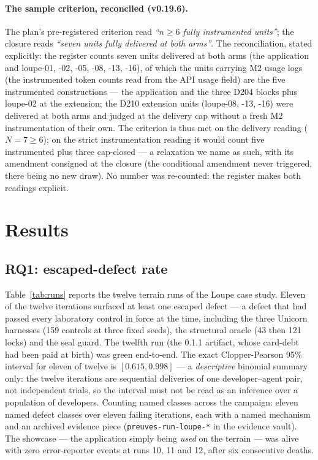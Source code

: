 \documentclass[10pt,a4paper]{article}
\newcommand{\code}[1]{\texttt{\small #1}}
\begin{document}
\paragraph{The sample criterion, reconciled (v0.19.6).} The plan's
pre-registered criterion read \emph{``$n\ge6$ fully instrumented
units''}; the closure reads \emph{``seven units fully delivered at
both arms''}. The reconciliation, stated explicitly: the register
counts seven units delivered at both arms (the application and
loupe-01, -02, -05, -08, -13, -16), of which the units carrying
M2 usage logs (the instrumented token counts read from the API
usage field) are the five instrumented constructions --- the
application and the three D204 blocks plus loupe-02 at the
extension; the D210 extension units (loupe-08, -13, -16) were
delivered at both arms and judged at the delivery cap without a
fresh M2 instrumentation of their own. The criterion is thus met
on the delivery reading ($N{=}7\ge6$); on the strict instrumentation
reading it would count five instrumented plus three cap-closed ---
a relaxation we name as such, with its amendment consigned at the
closure (the conditional amendment never triggered, there being no
new draw). No number was re-counted: the register makes both
readings explicit.

\section{Results}\label{sec:results}

\subsection{RQ1: escaped-defect rate}\label{sec:rq1}

Table~\ref{tab:runs} reports the twelve terrain runs of the Loupe case
study. Eleven of the twelve iterations surfaced at least one escaped
defect --- a defect that had passed every laboratory control in force at
the time, including the three Unicorn harnesses (159 controls at three
fixed seeds), the structural oracle (43 then 121 locks) and the seal
guard. The twelfth run (the 0.1.1 artifact, whose card-debt had been paid
at birth) was green end-to-end. The exact Clopper-Pearson 95\% interval
for eleven of twelve is $[0.615, 0.998]$ --- a \emph{descriptive}
binomial summary only: the twelve iterations are sequential deliveries
of one developer--agent pair, not independent trials, so the interval
must not be read as an inference over a population of developers.
Counting named classes across the
campaign: eleven named defect classes over eleven failing iterations,
each with a named mechanism and an archived evidence piece
(\code{preuves-run-loupe-*} in the evidence vault). The showcase ---
the application simply being \emph{used} on the terrain --- was alive with
zero error-reporter events at runs 10, 11 and 12, after six consecutive
deaths.
\end{document}
